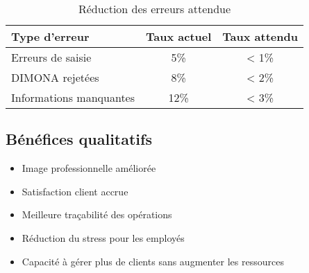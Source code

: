 \begin{table}[h]
\centering
\begin{tabular}{|l|c|c|}
\hline
\textbf{Type d'erreur} & \textbf{Taux actuel} & \textbf{Taux attendu} \\
\hline
Erreurs de saisie & 5\% & < 1\% \\
DIMONA rejetées & 8\% & < 2\% \\
Informations manquantes & 12\% & < 3\% \\
\hline
\end{tabular}
\caption{Réduction des erreurs attendue}
\end{table}

\subsection{Bénéfices qualitatifs}

\begin{itemize}[leftmargin=*,label=\textcolor{darkgray}{$\bullet$},itemsep=0.3em]
  \item Image professionnelle améliorée
  \item Satisfaction client accrue
  \item Meilleure traçabilité des opérations
  \item Réduction du stress pour les employés
  \item Capacité à gérer plus de clients sans augmenter les ressources
\end{itemize}

